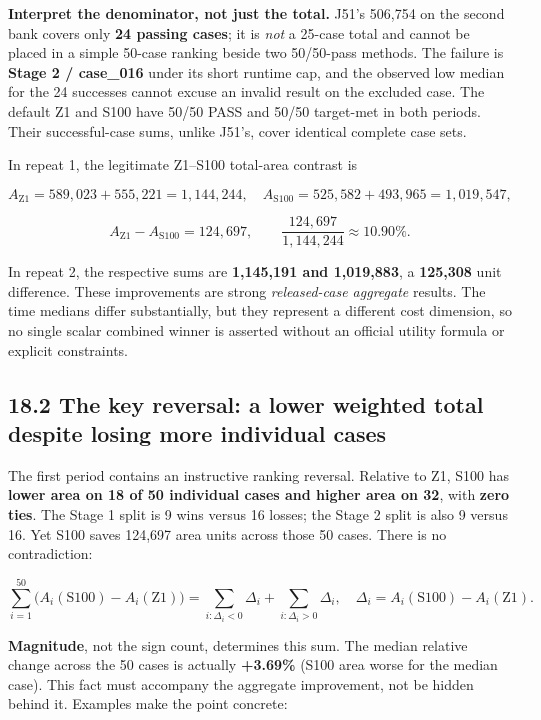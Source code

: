 \textbf{Interpret the denominator, not just the total.} J51's 506,754 on the second bank covers only \textbf{24 passing cases}; it is \emph{not} a 25-case total and cannot be placed in a simple 50-case ranking beside two 50/50-pass methods. The failure is \textbf{Stage 2 / case\_016} under its short runtime cap, and the observed low median for the 24 successes cannot excuse an invalid result on the excluded case. The default Z1 and S100 have 50/50 PASS and 50/50 target-met in both periods. Their successful-case sums, unlike J51's, cover identical complete case sets.

In repeat 1, the legitimate Z1--S100 total-area contrast is

\[
A_{\mathrm{Z1}}=589{,}023+555{,}221=1{,}144{,}244,
\quad A_{\mathrm{S100}}=525{,}582+493{,}965=1{,}019{,}547,
\]

\[
A_{\mathrm{Z1}}-A_{\mathrm{S100}}=124{,}697,
\qquad \frac{124{,}697}{1{,}144{,}244}\approx 10.90\%.
\]

In repeat 2, the respective sums are \textbf{1,145,191 and 1,019,883}, a \textbf{125,308} unit difference. These improvements are strong \emph{released-case aggregate} results. The time medians differ substantially, but they represent a different cost dimension, so no single scalar combined winner is asserted without an official utility formula or explicit constraints.

\subsection{18.2 The key reversal: a lower weighted total despite losing more individual cases}\label{the-key-reversal-a-lower-weighted-total-despite-losing-more-individual-cases}

The first period contains an instructive ranking reversal. Relative to Z1, S100 has \textbf{lower area on 18 of 50 individual cases and higher area on 32}, with \textbf{zero ties}. The Stage 1 split is 9 wins versus 16 losses; the Stage 2 split is also 9 versus 16. Yet S100 saves 124,697 area units across those 50 cases. There is no contradiction:

\[
\sum_{i=1}^{50}\bigl(A_i(\mathrm{S100})-A_i(\mathrm{Z1})\bigr)
= \sum_{i:\Delta_i<0}\Delta_i+\sum_{i:\Delta_i>0}\Delta_i,
\quad\Delta_i=A_i(\mathrm{S100})-A_i(\mathrm{Z1}).
\]

\textbf{Magnitude}, not the sign count, determines this sum. The median relative change across the 50 cases is actually \textbf{+3.69\%} (S100 area worse for the median case). This fact must accompany the aggregate improvement, not be hidden behind it. Examples make the point concrete:

